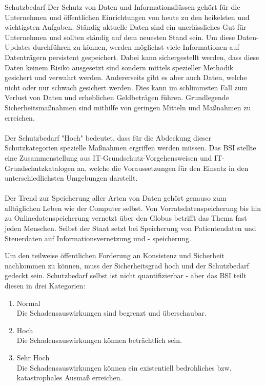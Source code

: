  \label{Schutzbedarf}
 \begin{section}{Schutzbedarf}
  Der Schutz von Daten und Informationsflüssen gehört für die Unternehmen und öffentlichen
  Einrichtungen von heute zu den heikelsten und wichtigsten Aufgaben. Ständig aktuelle 
  Daten sind ein unerlässliches Gut für Unternehmen und sollten ständig auf dem neuesten 
  Stand sein. Um diese Daten-Updates durchführen zu können, werden möglichst viele 
  Informationen auf Datenträgern persistent gespeichert. Dabei kann sichergestellt werden, 
  dass diese Daten keinem Risiko ausgesetzt sind sondern mittels spezieller Methodik 
  gesichert und verwahrt werden. Andererseits gibt es aber auch Daten, welche nicht oder 
  nur schwach gesichert werden. Dies kann im schlimmsten Fall zum Verlust von Daten und 
  erheblichen Geldbeträgen führen. Grundlegende Sicherheitsmaßnahmen sind mithilfe von 
  geringen Mitteln und Maßnahmen zu erreichen. \\
  \\
  Der Schutzbedarf "Hoch" bedeutet, dass für die Abdeckung dieser Schutzkategorien 
  spezielle Maßnahmen ergriffen werden müssen. 
  Das \ac{BSI} stellte eine Zusammenstellung aus IT-Grundschutz-Vorgehensweisen und IT-Grundschutzkatalogen
  an, welche die Voraussetzungen für den Einsatz in den unterschiedlichsten Umgebungen 
  darstellt. \\
  \\
  Der Trend zur Speicherung aller Arten von Daten gehört genauso zum alltäglichen Leben 
  wie der Computer selbst. Von Vorratsdatenspeicherung bis hin zu Onlinedatenspeicherung 
  vernetzt über den Globus betrifft das Thema fast jeden Menschen. Selbst der Staat setzt 
  bei Speicherung von Patientendaten und Steuerdaten auf Informationsvernetzung und - speicherung.   
  \DIFdelbegin %
\DIFdelend \DIFaddbegin \pagebreak

  \DIFaddend Um den teilweise öffentlichen Forderung an Konsistenz und Sicherheit nachkommen zu 
  können, muss der Sicherheitsgrad hoch und der Schutzbedarf gedeckt sein. 
  Schutzbedarf selbst ist nicht quantifizierbar - aber das \ac{BSI} teilt diesen in drei 
  Kategorien: \DIFaddbegin \cite{BSIBedarf} \DIFaddend \\
  \begin{enumerate} 
   \item Normal \\
    Die Schadensauswirkungen sind begrenzt und überschaubar.
   \item Hoch \\
    Die Schadensauswirkungen können beträchtlich sein.
   \item Sehr Hoch \\
    Die Schadensauswirkungen können ein existentiell bedrohliches bzw. katastrophales 
    Ausmaß erreichen. 
  \DIFdelbegin %
\DIFdelend \end{enumerate}
  \DIFdelbegin %
\DIFdelend 


\end{section}
